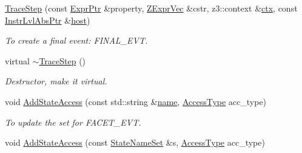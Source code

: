 \begin{DoxyCompactItemize}
\mbox{\label{classilang_1_1_trace_step_affbe3297e4c725e08a851177c215c7ed}} 
\mbox{\hyperlink{classilang_1_1_trace_step_affbe3297e4c725e08a851177c215c7ed}{Trace\+Step}} (const \mbox{\hyperlink{namespaceilang_a7c4196c72e53ea4df4b7861af7bc3bce}{Expr\+Ptr}} \&property, \mbox{\hyperlink{classilang_1_1_trace_step_a19a387426712dbec11dcecf170fb7e1a}{Z\+Expr\+Vec}} \&cstr, z3\+::context \&\mbox{\hyperlink{classilang_1_1_trace_step_afcab3e7a5ce7b619dd445882a9846c93}{ctx}}, const \mbox{\hyperlink{namespaceilang_ad1b30fdf347e493b3937143da05d1a72}{Instr\+Lvl\+Abs\+Ptr}} \&\mbox{\hyperlink{classilang_1_1_trace_step_abac6e1d81a83a513e89f8e5a7e0aa12d}{host}})
\begin{DoxyCompactList}\small\item\em To create a final event\+: F\+I\+N\+A\+L\+\_\+\+E\+VT. \end{DoxyCompactList}\item 
\mbox{\label{classilang_1_1_trace_step_ad82970790c1930b6da444d6ddc5c78e7}} 
virtual \mbox{\hyperlink{classilang_1_1_trace_step_ad82970790c1930b6da444d6ddc5c78e7}{$\sim$\+Trace\+Step}} ()
\begin{DoxyCompactList}\small\item\em Destructor, make it virtual. \end{DoxyCompactList}\item 
\mbox{\label{classilang_1_1_trace_step_a9b9d72154fce43d0640383e17b3a3a29}} 
void \mbox{\hyperlink{classilang_1_1_trace_step_a9b9d72154fce43d0640383e17b3a3a29}{Add\+State\+Access}} (const std\+::string \&\mbox{\hyperlink{classilang_1_1_trace_step_a38df7c1cd47ec7dc399b8ecb8dbaf2a7}{name}}, \mbox{\hyperlink{namespaceilang_ab4dc990a0af528177f6f90b63bd208c7}{Access\+Type}} acc\+\_\+type)
\begin{DoxyCompactList}\small\item\em To update the set for F\+A\+C\+E\+T\+\_\+\+E\+VT. \end{DoxyCompactList}\item 
\mbox{\label{classilang_1_1_trace_step_af83c548a59be2dfbb55f8e306665e1b0}} 
void \mbox{\hyperlink{classilang_1_1_trace_step_af83c548a59be2dfbb55f8e306665e1b0}{Add\+State\+Access}} (const \mbox{\hyperlink{classilang_1_1_trace_step_a784c4a30b16707ec6a2ed6e96e268c86}{State\+Name\+Set}} \&s, \mbox{\hyperlink{namespaceilang_ab4dc990a0af528177f6f90b63bd208c7}{Access\+Type}} acc\+\_\+type)

\end{DoxyCompactItemize}
